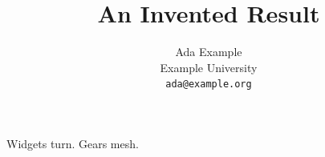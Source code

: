 \documentclass{article}
\title{An Invented Result}
\author{Ada Example \\ Example University \\ \texttt{ada@example.org}}
\begin{document}
\maketitle
Widgets turn.
\newpage
Gears mesh.
\end{document}
